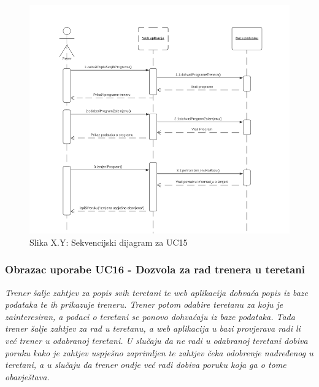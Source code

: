                     \begin{figure}[H]
			            \includegraphics[scale=1.0]{slike/UC15.PNG} %
			            \centering
			            \caption{Slika X.Y: Sekvencijski dijagram za UC15}
			            \label{fig:promjene}
		            \end{figure}
                    
                    
                    \subsubsection{Obrazac uporabe UC16 - Dozvola za rad trenera u teretani}
					\textit{Trener šalje zahtjev za popis svih teretani te web aplikacija dohvaća popis
                    iz baze podataka te ih prikazuje treneru. Trener potom odabire teretanu za 
                    koju je zainteresiran, a podaci o teretani se ponovo dohvaćaju iz baze podataka.
                    Tada trener šalje zahtjev za rad u teretanu, a web aplikacija u bazi provjerava
                    radi li već trener u odabranoj teretani. U slučaju da ne radi u odabranoj teretani
                    dobiva poruku kako je zahtjev uspješno zaprimljen te zahtjev čeka odobrenje nadređenog
                    u teretani, a u slučaju da trener ondje već radi dobiva poruku koja ga o tome obavještava.}\\
                    
